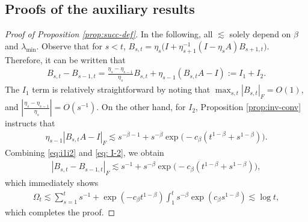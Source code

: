 \documentclass[a4paper,11pt]{article}
\numberwithin{equation}{section}
\theoremstyle{plain}
\theoremstyle{remark}
\begin{document}
\subsection{Proofs of the auxiliary results}
\begin{proof}[Proof of Proposition \ref{prop:succ-def}]
    In the following, all $\lesssim$ solely depend on $\beta$ and $\lambda_{\min}$. Observe that for $s<t$, $B_{s, t}=\eta_s \big(I + \eta_{s+1}^{-1}(I -\eta_s A)B_{s+1,t}\big)$. Therefore, it can be written that
    \begin{align}
        B_{s,t} -B_{s-1, t} = \frac{\eta_s - \eta_{s-1}}{\eta_s}B_{s,t} + \eta_{s-1}(B_{s,t} A - I):= I_1 + I_2. \label{eq:i1i2}
    \end{align}
    The $I_1$ term is relatively straightforward by noting that $\max_{s,t}|B_{s,t}|_F=O(1)$, and $|\frac{\eta_s - \eta_{s-1}}{\eta_s}| = O(s^{-1})$. On the other hand, for $I_2$, Proposition \ref{prop:inv-conv} instructs that 
    \begin{align} \label{eq: I-2}
         \eta_{s-1}|B_{s,t} A - I|_F\lesssim s^{-\beta-1} + s^{-\beta}\exp\big(-c_{\beta}(t^{1-\beta} + s^{1-\beta})\big).
    \end{align}
    Combining \eqref{eq:i1i2} and \eqref{eq: I-2}, we obtain
    \begin{align*}
        |B_{s,t} -B_{s-1, t}|_F \lesssim s^{-1} + s^{-\beta}\exp\big(-c_{\beta}(t^{1-\beta} + s^{1-\beta})\big),
    \end{align*}
    which immediately shows 
    \begin{align*}
        \Omega_t \lesssim \sum_{s=1}^t s^{-1} + \exp(-c_{\beta} t^{1-\beta})\int_1^ts^{-\beta}\exp(c_{\beta}s^{1-\beta}) \lesssim \log t,
    \end{align*}
    which completes the proof. 
\end{proof}
\end{document}
